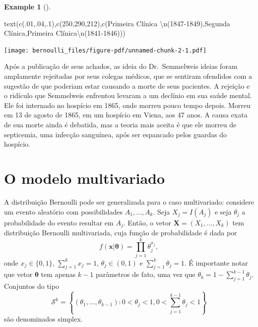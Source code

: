 \documentclass[
  letterpaper,
  DIV=11,
  numbers=noendperiod]{scrreprt}
\newenvironment{Shaded}{\begin{snugshade}}{\end{snugshade}}
\newcommand{\DecValTok}[1]{\textcolor[rgb]{0.68,0.00,0.00}{#1}}
\newcommand{\FunctionTok}[1]{\textcolor[rgb]{0.28,0.35,0.67}{#1}}
\newcommand{\NormalTok}[1]{\textcolor[rgb]{0.00,0.23,0.31}{#1}}
\newcommand{\SpecialCharTok}[1]{\textcolor[rgb]{0.37,0.37,0.37}{#1}}
\newcommand{\StringTok}[1]{\textcolor[rgb]{0.13,0.47,0.30}{#1}}
\theoremstyle{plain}
\theoremstyle{definition}
\newtheorem{example}{Example}[chapter]
\theoremstyle{definition}
\theoremstyle{remark}
\begin{document}
\begin{example}[]
\begin{Shaded}
\begin{Highlighting}[]
\FunctionTok{text}\NormalTok{(}\FunctionTok{c}\NormalTok{(.}\DecValTok{01}\NormalTok{,.}\DecValTok{04}\NormalTok{,.}\DecValTok{1}\NormalTok{),}\FunctionTok{c}\NormalTok{(}\DecValTok{250}\NormalTok{,}\DecValTok{290}\NormalTok{,}\DecValTok{212}\NormalTok{),}\FunctionTok{c}\NormalTok{(}\StringTok{\textquotesingle{}Primeira Clínica }\SpecialCharTok{\textbackslash{}n}\StringTok{(1847{-}1849)\textquotesingle{}}\NormalTok{,}\StringTok{\textquotesingle{}Segunda Clínica\textquotesingle{}}\NormalTok{,}\StringTok{\textquotesingle{}Primeira Clínica}\SpecialCharTok{\textbackslash{}n}\StringTok{(1841{-}1846)\textquotesingle{}}\NormalTok{))}
\end{Highlighting}
\end{Shaded}

\texttt{[image: bernoulli\_files/figure-pdf/unnamed-chunk-2-1.pdf]}

Após a publicação de seus achados, as ideia do Dr.~Semmelweis ideias
foram amplamente rejeitadas por seus colegas médicos, que se sentiram
ofendidos com a sugestão de que poderiam estar causando a morte de seus
pacientes. A rejeição e o ridículo que Semmelweis enfrentou levaram a um
declínio em sua saúde mental. Ele foi internado no hospício em 1865,
onde morreu pouco tempo depois. Morreu em 13 de agosto de 1865, em um
hospício em Viena, aos 47 anos. A causa exata de sua morte ainda é
debatida, mas a teoria mais aceita é que ele morreu de septicemia, uma
infecção sanguínea, após ser espancado pelos guardas do hospício.

\end{example}

\section{O modelo multivariado}\label{o-modelo-multivariado}

A distribuição Bernoulli pode ser generalizada para o caso multivariado:
considere um evento aleatório com possibilidades \(A_1,\ldots,A_k\).
Seja \(X_j=I(A_j)\) e seja \(\theta_j\) a probabilidade do evento
resultar em \(A_j\). Então, o vetor \(\boldsymbol{X}=(X_1,\ldots,X_k)\)
tem distribuição Bernoulli multivariada, cuja função de probabilidade é
dada por
\[f(\boldsymbol{x}|\boldsymbol{\theta})=\prod_{j=1}^k\theta_j^{x_{j}},\]
onde \(x_j\in\{0,1\}\), \(\sum_{j=1}^kx_j=1\), \(\theta_j\in(0,1)\) e
\(\sum_{j=1}^k\theta_j=1\). É importante notar que vetor
\(\boldsymbol{\theta}\) tem apenas \(k-1\) parâmetros de fato, uma vez
que \(\theta_k=1-\sum_{j=1}^{k-1}\theta_j\). Conjuntos do tipo
\[\mathcal{S}^k=\left\{(\theta_1,\ldots,\theta_{k-1}):0<\theta_j<1,0<\sum_{j=1}^{k-1}\theta_j<1\right\}\]
são denominados simplex.
\end{document}
